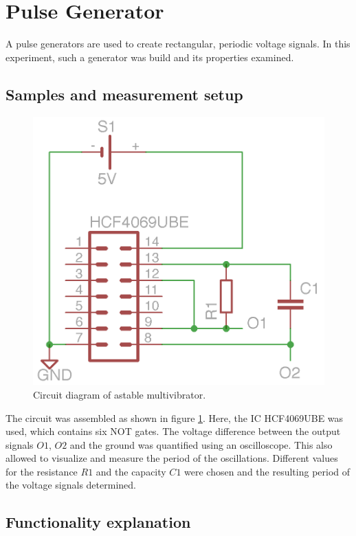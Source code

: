 \documentclass[journal]{IEEEtran}
\begin{document}
\section{Pulse Generator}

A pulse generators are used to create rectangular, periodic voltage signals. In
this experiment, such a generator was build and its properties examined. 

\subsection{Samples and measurement setup}

\begin{figure}[h!]
  \centering
   \includegraphics[]{boards/astabil_multivibrator.png}
   \caption{Circuit diagram of astable multivibrator.}
   \label{fig:am_board}
\end{figure}

The circuit was assembled as shown in figure \ref{fig:am_board}. Here, the IC
HCF4069UBE was used, which contains six NOT gates. The voltage difference
between the output signals $O1$, $O2$ and the ground was quantified using an
oscilloscope. This also allowed to visualize and measure the period of the
oscillations.
Different values for the resistance $R1$ and the capacity $C1$ were chosen and
the resulting period of the voltage signals determined.

\subsection{Functionality explanation}
\end{document}
